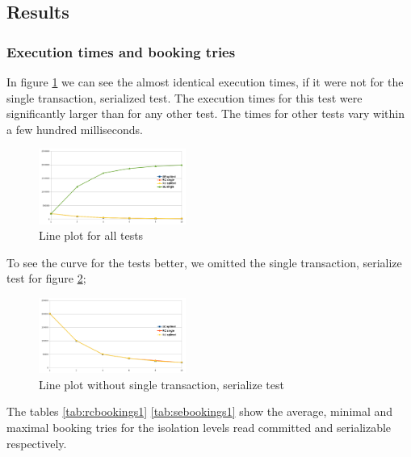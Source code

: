 \documentclass{vldb}
\begin{document}
\subsection{Results}
\subsubsection{Execution times and booking tries}
In figure \ref{img:lineplot1} we can see the almost identical execution times, if it were not for the single transaction, serialized test. The execution times for this test were significantly larger than for any other test. The times for other tests vary within a few hundred milliseconds.
\begin{figure}[H]
	\centering
	\includegraphics[width=0.43\textwidth]{results-jdbc-isolevels/lineplot.png}
	\caption{Line plot for all tests}
	\label{img:lineplot1}
\end{figure}
To see the curve for the tests better, we omitted the single transaction, serialize test for figure \ref{img:lineplot2};
\begin{figure}[H]
	\centering
	\includegraphics[width=0.43\textwidth]{results-jdbc-isolevels/lineplot-without-singleserliaze.png}
	\caption{Line plot without single transaction, serialize test}
	\label{img:lineplot2}
\end{figure}
The tables \ref{tab:rcbookings1} \ref{tab:sebookings1} show the average, minimal and maximal booking tries for the isolation levels read committed and serializable respectively.
\end{document}
